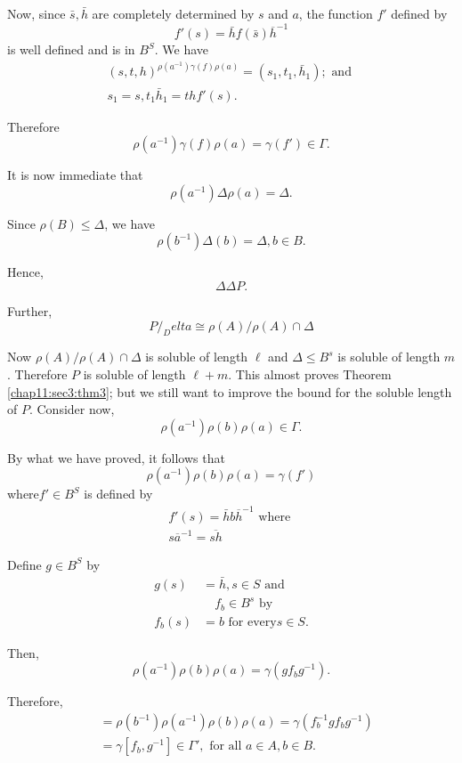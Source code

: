 Now, since $\bar{s},\bar{h}$ are completely determined by $s$ and $a$,
the function $f'$ defined by  
$$
f'(s)= \bar{h}f(\bar{s}) \overline{h}^{-1}
$$ 
is well defined and is in $B^S$. We have 
\begin{gather*}
  (s,t,h) ^{\rho (a^{-1}) \gamma (f) \rho (a)} =  (s_1, t_1, \bar{h}_1)
  ; \text{ and } \\ 
  s_1 = s, t_1 \bar{h}_1 = thf' (s). 
\end{gather*}

Therefore\pageoriginale 
$$
\rho(a^{-1}) \gamma (f) \rho (a) = \gamma (f') \in  \Gamma.
$$

It is now immediate that 
$$
\rho(a^{-1}) \Delta \rho (a) = \Delta. 
$$

Since $\rho (B) \le \Delta$, we have 
$$
\rho (b^{-1}) \Delta (b) = \Delta, b \in  B.
$$

Hence,
$$
\Delta \Delta P.
$$

Further,
$$
P/ _Delta \cong \rho (A) / \rho (A) \cap \Delta
$$

Now $\rho (A) / \rho (A) \cap \Delta$ is soluble of length $\ell$ and
$\Delta \le B^s$ is soluble of length $m$. Therefore $P$ is soluble of
length $\ell +m$. This almost proves Theorem \ref{chap11:sec3:thm3}; but we still want
to improve the bound for the soluble length of $P$. Consider now, 
$$
\rho(a^{-1}) \rho (b) \rho (a) \in  \Gamma.
$$

By what we have proved, it follows that 
$$
\rho(a^{-1}) \rho (b) \rho (a) = \gamma (f')
$$
where\pageoriginale $f' \in  B^S$ is defined by 
\begin{gather*}
  f'(s) = \bar{h} b \overline{h}^{-1} \text{ where }\\
  s \overline{a}^{-1} = \overline{sh}
\end{gather*}

Define $g \in  B^S$ by
\begin{align*}
  g(s) & = \bar{h},  s \in  S \text{ and }\\
  & \quad f_b \in  B^s \text{ by }\\
  f_b(s) & = b \text{ for every} s \in  S.
\end{align*}

Then,
$$
\rho(a^{-1}) \rho (b) \rho (a) = \gamma (gf_b g^{-1}).
$$

Therefore,
\begin{align*}
[ \rho (b), \rho(a)] & = \rho(b^{-1}) \rho(a^{-1}) \rho(b) \rho(a) =
\gamma (f^{-1}_{b} g {f_b} g^{-1})\\ 
& = \gamma [f_b, g^{-1}] \in \Gamma' ,
\text{ for all } a \in  A, b \in  B. 
\end{align*}

